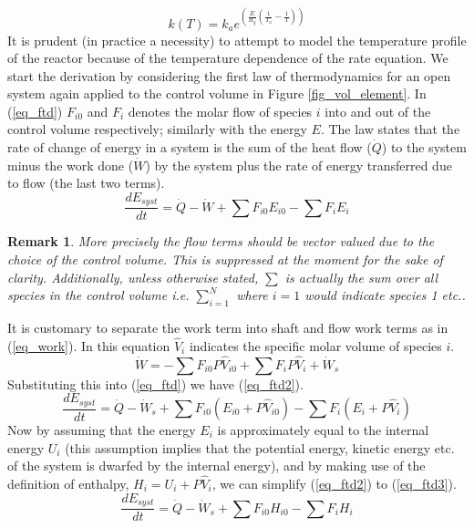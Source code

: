 \documentclass[11pt,fleqn]{article}
\theoremstyle{defstyle}
\newtheorem{rmrk}{Remark}[section]
\begin{document}
\begin{equation}
k(T) = k_a e^{\left(\frac{E}{R_g}\left(\frac{1}{T_a} - \frac{1}{T}\right)\right)}
\label{eq_arrhenius}
\end{equation} 
It is prudent (in practice a necessity) to attempt to model the temperature profile of the reactor because of the temperature dependence of the rate equation. We start the derivation by considering the first law of thermodynamics for an open system again applied to the control volume in Figure \ref{fig_vol_element}. In (\ref{eq_ftd}) $F_{i0}$ and $F_{i}$ denotes the molar flow of species $i$ into and out of the control volume respectively; similarly with the energy $E$. The law states that the rate of change of energy in a system is the sum of the heat flow ($\dot{Q}$) to the system minus the work done ($\dot{W}$) by the system plus the rate of energy transferred due to flow (the last two terms). 
\begin{equation}
\frac{d E_{syst}}{dt} = \dot{Q} - \dot{W} + \sum F_{i0}E_{i0} -\sum F_{i}E_{i}
\label{eq_ftd}
\end{equation}
\begin{rmrk}
More precisely the flow terms should be vector valued due to the choice of the control volume. This is suppressed at the moment for the sake of clarity. Additionally, unless otherwise stated, $\sum$ is actually the sum over all species in the control volume i.e. $\sum_{i=1}^{N}$ where $i=1$ would indicate species 1 etc.. 
\end{rmrk}
It is customary to separate the work term into shaft and flow work terms as in (\ref{eq_work}). In this equation $\hat{V}_i$ indicates the specific molar volume of species $i$.
\begin{equation}
\dot{W} = -\sum F_{i0}P\hat{V}_{i0} + \sum F_{i}P\hat{V}_{i} + \dot{W}_s
\label{eq_work} 
\end{equation}
Substituting this into (\ref{eq_ftd}) we have (\ref{eq_ftd2}).
\begin{equation}
\frac{d E_{syst}}{dt} = \dot{Q} - \dot{W}_s + \sum F_{i0}(E_{i0}+P\hat{V}_{i0}) -\sum F_{i}(E_{i}+P\hat{V}_{i})
\label{eq_ftd2}
\end{equation}
Now by assuming that the energy $E_i$ is approximately equal to the internal energy $U_i$ (this assumption implies that the potential energy, kinetic energy etc. of the system is dwarfed by the internal energy), and by making use of the definition of enthalpy, $H_i = U_i + P\hat{V}_i$, we can simplify (\ref{eq_ftd2}) to (\ref{eq_ftd3}).
\begin{equation}
\frac{d E_{syst}}{dt} = \dot{Q} - \dot{W}_s + \sum F_{i0}H_{i0} -\sum F_{i}H_{i}
\label{eq_ftd3}
\end{equation} 
\end{document}
